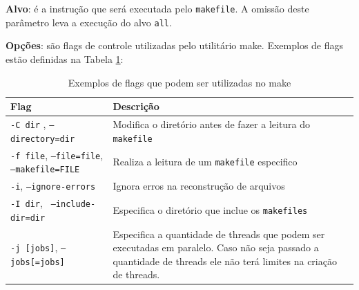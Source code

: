 \textbf{Alvo}: é a instrução que será executada pelo \texttt{makefile}. 
A omissão deste parâmetro leva a execução do alvo \texttt{all}.
    
\textbf{Opções}: são flags de controle utilizadas pelo utilitário make.
 Exemplos de flags estão definidas na Tabela \ref{tab:tabela_05}:

\begin{table}[h]
    \centering
    \caption {Exemplos de flags que podem ser utilizadas no make}
    \label{tab:tabela_05}
    \begin{tabular}{ lp{8cm}}
    \toprule
    \textbf{Flag} & \textbf{Descrição}\\
    \midrule
    \texttt{-C dir} , \texttt{--directory=dir} & Modifica o diretório antes de fazer a leitura do \texttt{makefile}\\
    \midrule
    \texttt{-f file}, \texttt{--file=file}, \texttt{--makefile=FILE} & Realiza a leitura de um \texttt{makefile} especifico\\
    \midrule
    \texttt{-i}, \texttt{--ignore-errors} & Ignora erros na reconstrução de arquivos\\
    \midrule
    \texttt{-I dir}, \texttt{ --include-dir=dir} & Especifica o diretório que inclue os \texttt{makefiles}\\
    \midrule
    \texttt{-j [jobs]}, \texttt{--jobs[=jobs]} & Especifica a quantidade de threads
                                 que podem ser executadas em paralelo. 
                                 Caso não seja passado a quantidade de
                                 threads ele não terá limites na criação
                                 de threads.\\
    \bottomrule
    \end{tabular}
\end{table}
